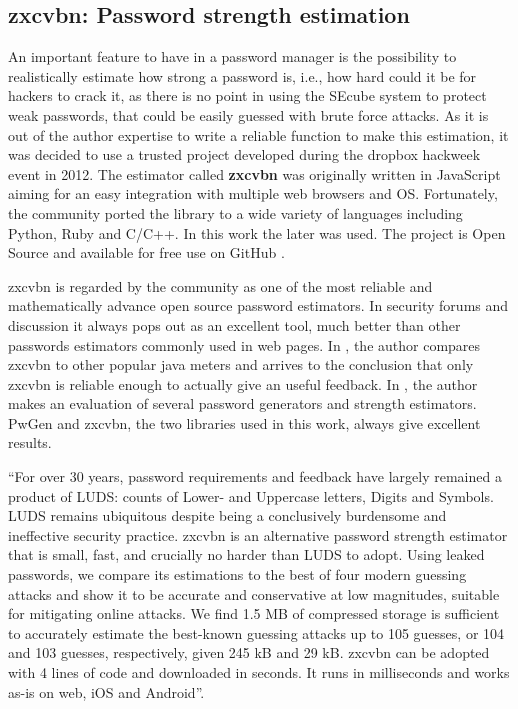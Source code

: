 \subsection{zxcvbn: Password strength estimation} \label{sec:zxcvbn}

An important feature to have in a password manager is the possibility to realistically estimate how strong a password is, i.e., how hard could it be for hackers to crack it, as there is no point in using the SEcube system to protect weak passwords, that could be easily guessed with brute force attacks. As it is out of the author expertise to write a reliable function to make this estimation, it was decided to use a trusted project developed during the dropbox hackweek event in 2012. The estimator called \textbf{zxcvbn} was originally written in JavaScript aiming for an easy integration with multiple web browsers and OS. Fortunately, the community ported the library to a wide variety of languages including Python, Ruby and C/C++. In this work the later was used. The project is Open Source and available for free use on GitHub \cite{zxgit}.

zxcvbn is regarded by the community as one of the most reliable and mathematically advance open source password estimators. In security forums and discussion it always pops out as an excellent tool, much better than other passwords estimators commonly used in web pages. In \cite{naked}, the author compares zxcvbn to other popular java meters and arrives to the conclusion that only zxcvbn is reliable enough to actually give an useful feedback.
In \cite{gen_est_eval}, the author makes an evaluation of several password generators and strength estimators. PwGen and zxcvbn, the two libraries used in this work, always give excellent results.

``For over 30 years, password requirements and feedback have largely remained a product of LUDS: counts of Lower- and Uppercase letters, Digits and Symbols. LUDS remains ubiquitous despite being a conclusively burdensome and ineffective security practice. zxcvbn is an alternative password strength estimator that is small, fast, and crucially no harder than LUDS to adopt. Using leaked passwords, we compare its estimations to the best of four modern guessing attacks and show it to be accurate and conservative at low magnitudes, suitable for mitigating online attacks. We find 1.5 MB of compressed storage is sufficient to accurately estimate the best-known guessing attacks up to 105 guesses, or 104 and 103 guesses, respectively, given 245 kB and 29 kB. zxcvbn can be adopted with 4 lines of code and downloaded in seconds. It runs in milliseconds and works as-is on web, iOS and Android''. \cite{zxpaper}

